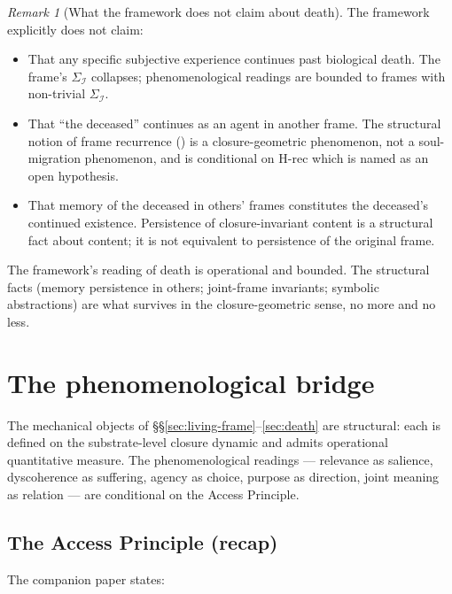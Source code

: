\documentclass[11pt]{article}
\theoremstyle{plain}
\theoremstyle{definition}
\theoremstyle{remark}
\newtheorem{remark}[theorem]{Remark}
\newcommand{\Ical}{\mathcal{I}}
\begin{document}
\begin{remark}[What the framework does not claim about death]\label{rem:death-discipline}
The framework explicitly does not claim:
\begin{itemize}[leftmargin=2em]
\item That any specific subjective experience continues past biological death. The frame's $\Sigma_\Ical$ collapses; phenomenological readings are bounded to frames with non-trivial $\Sigma_\Ical$.
\item That ``the deceased'' continues as an agent in another frame. The structural notion of frame recurrence (\citet{SmartCosmicClosure}) is a closure-geometric phenomenon, not a soul-migration phenomenon, and is conditional on H-rec which is named as an open hypothesis.
\item That memory of the deceased in others' frames constitutes the deceased's continued existence. Persistence of closure-invariant content is a structural fact about content; it is not equivalent to persistence of the original frame.
\end{itemize}
The framework's reading of death is operational and bounded. The structural facts (memory persistence in others; joint-frame invariants; symbolic abstractions) are what survives in the closure-geometric sense, no more and no less.
\end{remark}

\section{The phenomenological bridge}\label{sec:phenomenology}

The mechanical objects of \S\S\ref{sec:living-frame}--\ref{sec:death} are structural: each is defined on the substrate-level closure dynamic and admits operational quantitative measure. The phenomenological readings --- relevance as salience, dyscoherence as suffering, agency as choice, purpose as direction, joint meaning as relation --- are conditional on the Access Principle.

\subsection{The Access Principle (recap)}

The companion paper \citet{SmartExistenceClosure} states:
\end{document}
